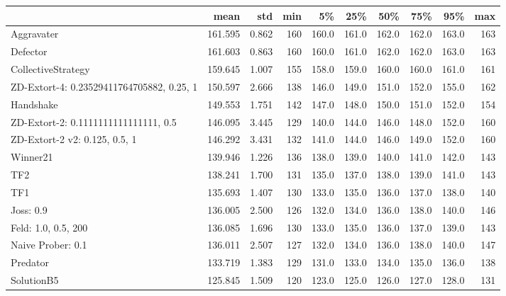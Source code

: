 \begin{tabular}{lrrrrrrrrr}
\toprule
{} &     mean &    std &  min &     5\% &    25\% &    50\% &    75\% &    95\% &  max \\
\midrule
Aggravater                                &  161.595 &  0.862 &  160 &  160.0 &  161.0 &  162.0 &  162.0 &  163.0 &  163 \\
Defector                                  &  161.603 &  0.863 &  160 &  160.0 &  161.0 &  162.0 &  162.0 &  163.0 &  163 \\
CollectiveStrategy                        &  159.645 &  1.007 &  155 &  158.0 &  159.0 &  160.0 &  160.0 &  161.0 &  161 \\
ZD-Extort-4: 0.23529411764705882, 0.25, 1 &  150.597 &  2.666 &  138 &  146.0 &  149.0 &  151.0 &  152.0 &  155.0 &  162 \\
Handshake                                 &  149.553 &  1.751 &  142 &  147.0 &  148.0 &  150.0 &  151.0 &  152.0 &  154 \\
ZD-Extort-2: 0.1111111111111111, 0.5      &  146.095 &  3.445 &  129 &  140.0 &  144.0 &  146.0 &  148.0 &  152.0 &  160 \\
ZD-Extort-2 v2: 0.125, 0.5, 1             &  146.292 &  3.431 &  132 &  141.0 &  144.0 &  146.0 &  149.0 &  152.0 &  160 \\
Winner21                                  &  139.946 &  1.226 &  136 &  138.0 &  139.0 &  140.0 &  141.0 &  142.0 &  143 \\
TF2                                       &  138.241 &  1.700 &  131 &  135.0 &  137.0 &  138.0 &  139.0 &  141.0 &  143 \\
TF1                                       &  135.693 &  1.407 &  130 &  133.0 &  135.0 &  136.0 &  137.0 &  138.0 &  140 \\
Joss: 0.9                                 &  136.005 &  2.500 &  126 &  132.0 &  134.0 &  136.0 &  138.0 &  140.0 &  146 \\
Feld: 1.0, 0.5, 200                       &  136.085 &  1.696 &  130 &  133.0 &  135.0 &  136.0 &  137.0 &  139.0 &  143 \\
Naive Prober: 0.1                         &  136.011 &  2.507 &  127 &  132.0 &  134.0 &  136.0 &  138.0 &  140.0 &  147 \\
Predator                                  &  133.719 &  1.383 &  129 &  131.0 &  133.0 &  134.0 &  135.0 &  136.0 &  138 \\
SolutionB5                                &  125.845 &  1.509 &  120 &  123.0 &  125.0 &  126.0 &  127.0 &  128.0 &  131 \\
\bottomrule
\end{tabular}

